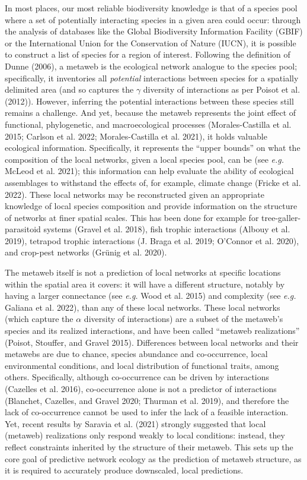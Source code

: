 \documentclass[
  letterpaper,
  DIV=11,
  numbers=noendperiod]{scrartcl}
\begin{document}
In most places, our most reliable biodiversity knowledge is that of a
species pool where a set of potentially interacting species in a given
area could occur: through the analysis of databases like the Global
Biodiversity Information Facility (GBIF) or the International Union for
the Conservation of Nature (IUCN), it is possible to construct a list of
species for a region of interest. Following the definition of Dunne
(2006), a metaweb is the ecological network analogue to the species
pool; specifically, it inventories all \emph{potential} interactions
between species for a spatially delimited area (and so captures the
\(\gamma\) diversity of interactions as per Poisot et al. (2012)).
However, inferring the potential interactions between these species
still remains a challenge. And yet, because the metaweb represents the
joint effect of functional, phylogenetic, and macroecological processes
(Morales-Castilla et al. 2015; Carlson et al. 2022; Morales-Castilla et
al. 2021), it holds valuable ecological information. Specifically, it
represents the ``upper bounds'' on what the composition of the local
networks, given a local species pool, can be (see \emph{e.g.} McLeod et
al. 2021); this information can help evaluate the ability of ecological
assemblages to withstand the effects of, for example, climate change
(Fricke et al. 2022). These local networks may be reconstructed given an
appropriate knowledge of local species composition and provide
information on the structure of networks at finer spatial scales. This
has been done for example for tree-galler-parasitoid systems (Gravel et
al. 2018), fish trophic interactions (Albouy et al. 2019), tetrapod
trophic interactions (J. Braga et al. 2019; O'Connor et al. 2020), and
crop-pest networks (Grünig et al. 2020).

The metaweb itself is not a prediction of local networks at specific
locations within the spatial area it covers: it will have a different
structure, notably by having a larger connectance (see \emph{e.g.} Wood
et al. 2015) and complexity (see \emph{e.g.} Galiana et al. 2022), than
any of these local networks. These local networks (which capture the
\(\alpha\) diversity of interactions) are a subset of the metaweb's
species and its realized interactions, and have been called ``metaweb
realizations'' (Poisot, Stouffer, and Gravel 2015). Differences between
local networks and their metawebs are due to chance, species abundance
and co-occurrence, local environmental conditions, and local
distribution of functional traits, among others. Specifically, although
co-occurrence can be driven by interactions (Cazelles et al. 2016),
co-occurrence alone is not a predictor of interactions (Blanchet,
Cazelles, and Gravel 2020; Thurman et al. 2019), and therefore the lack
of co-occurrence cannot be used to infer the lack of a feasible
interaction. Yet, recent results by Saravia et al. (2021) strongly
suggested that local (metaweb) realizations only respond weakly to local
conditions: instead, they reflect constraints inherited by the structure
of their metaweb. This sets up the core goal of predictive network
ecology as the prediction of metaweb structure, as it is required to
accurately produce downscaled, local predictions.
\end{document}
